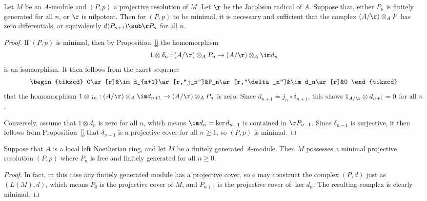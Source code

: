 \begin{proposition}\label{module minima projective resolution iff tensor with A/r}
Let $M$ be an $A$-module and $(P,p)$ a projective resolution of $M$. Let $\r$ be the Jacobson radical of $A$. Suppose that, either $P_n$ is finitely generated for all $n$, or $\r$ is nilpotent. Then for $(P,p)$ to be minimal, it is necessary and sufficient that the complex $(A/\r)\otimes_AP$ has zero differentials, or equivalently $d(P_{n+1})\sub\r P_n$ for all $n$.
\end{proposition}
\begin{proof}
If $(P,p)$ is minimal, then by Proposition~\ref{} the homomorphism
\[1\otimes\delta_n:(A/\r)\otimes_AP_n\to(A/\r)\otimes_A\im d_n\]
is an isomorphism. It then follows from the exact sequence
\[\begin{tikzcd}
0\ar[r]&\im d_{n+1}\ar[r,"j_n"]&P_n\ar[r,"\delta_n"]&\im d_n\ar[r]&0
\end{tikzcd}\]
that the homomorphism $1\otimes j_n:(A/\r)\otimes_A\im d_{n+1}\to (A/\r)\otimes_AP_n$ is zero. Since $d_{n+1}=j_n\circ\delta_{n+1}$, this shows $1_{A/\r}\otimes d_{n+1}=0$ for all $n$.\par 
Conversely, assume that $1\otimes d_n$ is zero for all $n$, which means $\im d_n=\ker d_{n-1}$ is contained in $\r P_{n-1}$. Since $\delta_{n-1}$ is surjective, it then follows from Proposition~\ref{} that $\delta_{n-1}$ is a projective cover for all $n\geq 1$, so $(P,p)$ is minimal.
\end{proof}
\begin{proposition}\label{module minimal projective resolution exist for Noe local}
Suppose that $A$ is a local left Noetherian ring, and let $M$ be a finitely generated $A$-module. Then $M$ possesses a minimal projective resolution $(P,p)$ where $P_n$ is free and finitely generated for all $n\geq 0$.
\end{proposition}
\begin{proof}
In fact, in this case any finitely generated module has a projective cover, so e may construct the complex $(P,d)$ just as $(L(M),d)$, which means $P_0$ is the projective cover of $M$, and $P_{n+1}$ is the projective cover of $\ker d_n$. The resulting complex is clearly minimal.
\end{proof}
